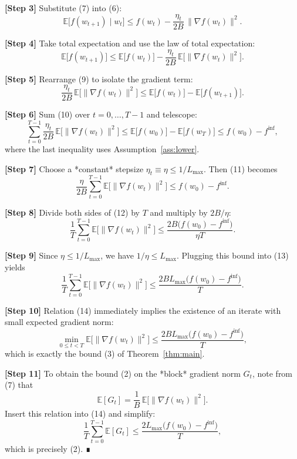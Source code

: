 \documentclass{article}
\begin{document}
\noindent\textbf{[Step 3]} Substitute (7) into (6):
\[
\mathbb{E}\!\bigl[f(w_{t+1})\mid w_{t}\bigr]
\le f(w_{t})-\frac{\eta_{t}}{2B}\,\bigl\|\nabla f(w_{t})\bigr\|^{2}.
\tag{8}
\]

\noindent\textbf{[Step 4]} Take total expectation and use the law of total expectation:
\[
\mathbb{E}\bigl[f(w_{t+1})\bigr]
\le \mathbb{E}\bigl[f(w_{t})\bigr]-\frac{\eta_{t}}{2B}\,
      \mathbb{E}\bigl[\bigl\|\nabla f(w_{t})\bigr\|^{2}\bigr].
\tag{9}
\]

\noindent\textbf{[Step 5]} Rearrange (9) to isolate the gradient term:
\[
\frac{\eta_{t}}{2B}\,
\mathbb{E}\bigl[\bigl\|\nabla f(w_{t})\bigr\|^{2}\bigr]
\le \mathbb{E}\bigl[f(w_{t})\bigr]-\mathbb{E}\bigl[f(w_{t+1})\bigr].
\tag{10}
\]

\noindent\textbf{[Step 6]} Sum (10) over $t=0,\dots ,T-1$ and telescope:
\[
\sum_{t=0}^{T-1}\frac{\eta_{t}}{2B}\,
\mathbb{E}\bigl[\bigl\|\nabla f(w_{t})\bigr\|^{2}\bigr]
\le \mathbb{E}\bigl[f(w_{0})\bigr]-\mathbb{E}\bigl[f(w_{T})\bigr]
\le f(w_{0})-f^{\inf},
\tag{11}
\]
where the last inequality uses Assumption~\ref{ass:lower}.

\noindent\textbf{[Step 7]} Choose a *constant* stepsize $\eta_{t}\equiv\eta\le 1/L_{\max}$.
Then (11) becomes
\[
\frac{\eta}{2B}\sum_{t=0}^{T-1}
\mathbb{E}\bigl[\bigl\|\nabla f(w_{t})\bigr\|^{2}\bigr]
\le f(w_{0})-f^{\inf}.
\tag{12}
\]

\noindent\textbf{[Step 8]} Divide both sides of (12) by $T$ and multiply by $2B/\eta$:
\[
\frac{1}{T}\sum_{t=0}^{T-1}
\mathbb{E}\bigl[\bigl\|\nabla f(w_{t})\bigr\|^{2}\bigr]
\le \frac{2B\bigl(f(w_{0})-f^{\inf}\bigr)}{\eta T}.
\tag{13}
\]

\noindent\textbf{[Step 9]} Since $\eta\le 1/L_{\max}$, we have $1/\eta\le L_{\max}$. Plugging this bound into (13) yields
\[
\frac{1}{T}\sum_{t=0}^{T-1}
\mathbb{E}\bigl[\bigl\|\nabla f(w_{t})\bigr\|^{2}\bigr]
\le \frac{2BL_{\max}\bigl(f(w_{0})-f^{\inf}\bigr)}{T}.
\tag{14}
\]

\noindent\textbf{[Step 10]} Relation (14) immediately implies the existence of an iterate with small expected gradient norm:
\[
\min_{0\le t<T}
\mathbb{E}\bigl[\bigl\|\nabla f(w_{t})\bigr\|^{2}\bigr]
\le
\frac{2BL_{\max}\bigl(f(w_{0})-f^{\inf}\bigr)}{T},
\tag{15}
\]
which is exactly the bound (3) of Theorem~\ref{thm:main}.

\noindent\textbf{[Step 11]} To obtain the bound (2) on the *block* gradient norm $G_{t}$, note from (7) that
\[
\mathbb{E}[G_{t}]
= \frac{1}{B}\,\mathbb{E}\bigl[\|\nabla f(w_{t})\|^{2}\bigr].
\]
Insert this relation into (14) and simplify:
\[
\frac{1}{T}\sum_{t=0}^{T-1}\mathbb{E}[G_{t}]
\le
\frac{2L_{\max}\bigl(f(w_{0})-f^{\inf}\bigr)}{T},
\]
which is precisely (2). ∎
\end{document}
